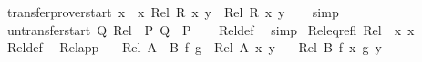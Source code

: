 \begin{isabellebody}
{\isafoldproof}%
%
\isadelimproof
\isanewline
%
\endisadelimproof
\isanewline
{}\isamarkupfalse%
\ transfer{\isacharunderscore}{\kern0pt}prover{\isacharunderscore}{\kern0pt}start{\isacharcolon}{\kern0pt}\ {\isachardoublequoteopen}{\isasymlbrakk}x\ {\isacharequal}{\kern0pt}\ x{\isacharprime}{\kern0pt}{\isacharsemicolon}{\kern0pt}\ Rel\ R\ x{\isacharprime}{\kern0pt}\ y{\isasymrbrakk}\ {\isasymLongrightarrow}\ Rel\ R\ x\ y{\isachardoublequoteclose}\isanewline
%
\isadelimproof
\ \ %
\endisadelimproof
%
\isatagproof
{}\isamarkupfalse%
\ simp%
\endisatagproof
{\isafoldproof}%
%
\isadelimproof
\isanewline
%
\endisadelimproof
\isanewline
{}\isamarkupfalse%
\ untransfer{\isacharunderscore}{\kern0pt}start{\isacharcolon}{\kern0pt}\ {\isachardoublequoteopen}{\isasymlbrakk}Q{\isacharsemicolon}{\kern0pt}\ Rel\ {\isacharparenleft}{\kern0pt}{\isacharequal}{\kern0pt}{\isacharparenright}{\kern0pt}\ P\ Q{\isasymrbrakk}\ {\isasymLongrightarrow}\ P{\isachardoublequoteclose}\isanewline
%
\isadelimproof
\ \ %
\endisadelimproof
%
\isatagproof
{}\isamarkupfalse%
\ Rel{\isacharunderscore}{\kern0pt}def\ \isamarkupfalse%
\ simp%
\endisatagproof
{\isafoldproof}%
%
\isadelimproof
\isanewline
%
\endisadelimproof
\isanewline
{}\isamarkupfalse%
\ Rel{\isacharunderscore}{\kern0pt}eq{\isacharunderscore}{\kern0pt}refl{\isacharcolon}{\kern0pt}\ {\isachardoublequoteopen}Rel\ {\isacharparenleft}{\kern0pt}{\isacharequal}{\kern0pt}{\isacharparenright}{\kern0pt}\ x\ x{\isachardoublequoteclose}\isanewline
%
\isadelimproof
\ \ %
\endisadelimproof
%
\isatagproof
{}\isamarkupfalse%
\ Rel{\isacharunderscore}{\kern0pt}def\ \isacommand{{\isachardot}{\kern0pt}{\isachardot}{\kern0pt}}\isamarkupfalse%
%
\endisatagproof
{\isafoldproof}%
%
\isadelimproof
\isanewline
%
\endisadelimproof
\isanewline
{}\isamarkupfalse%
\ Rel{\isacharunderscore}{\kern0pt}app{\isacharcolon}{\kern0pt}\isanewline
\ \ \ {\isachardoublequoteopen}Rel\ {\isacharparenleft}{\kern0pt}A\ {\isacharequal}{\kern0pt}{\isacharequal}{\kern0pt}{\isacharequal}{\kern0pt}{\isachargreater}{\kern0pt}\ B{\isacharparenright}{\kern0pt}\ f\ g{\isachardoublequoteclose}\ \ {\isachardoublequoteopen}Rel\ A\ x\ y{\isachardoublequoteclose}\isanewline
\ \ \ {\isachardoublequoteopen}Rel\ B\ {\isacharparenleft}{\kern0pt}f\ x{\isacharparenright}{\kern0pt}\ {\isacharparenleft}{\kern0pt}g\ y{\isacharparenright}{\kern0pt}{\isachardoublequoteclose}\isanewline
%
\isadelimproof
\ \ %
\endisadelimproof

\end{isabellebody}
